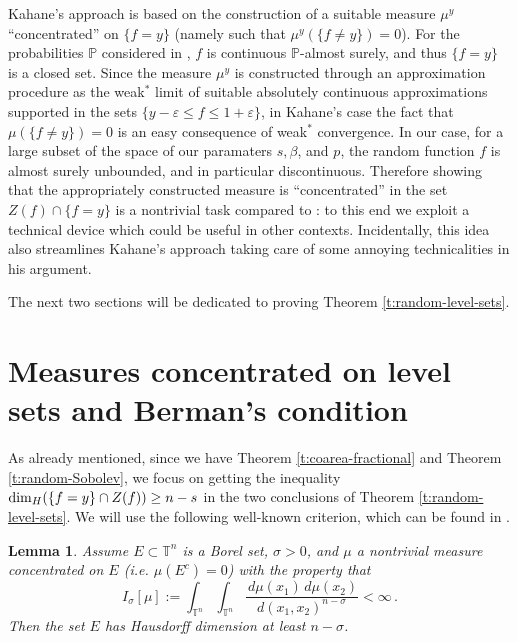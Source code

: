 \documentclass[11pt,reqno]{amsart}
\newcommand{\T}{{\mathbb T}}
\newtheorem{lemma}[theorem]{Lemma}
\theoremstyle{definition}
\numberwithin{equation}{section}
\begin{document}
\smallskip

Kahane's approach is based on the construction of a suitable measure $\mu^y$ ``concentrated'' on $\{f=y\}$ (namely such that $\mu^y (\{f\neq y\})=0$). For the probabilities $\mathbb P$ considered in  \cite{Kahane}, $f$ is continuous $\mathbb P$-almost surely, and thus $\{f=y\}$ is a closed set. Since the measure $\mu^y$ is constructed through an approximation procedure as the weak$^*$ limit of suitable absolutely continuous approximations supported in the sets $\{y-\varepsilon \leq f \leq 1+\varepsilon\}$, in Kahane's case the fact that $\mu (\{f\neq y\})=0$ is an easy consequence of weak$^*$ convergence. In our case, for a large subset of the space of our paramaters $s, \beta$, and $p$, the random function $f$ is almost surely unbounded, and in particular discontinuous. Therefore showing that the appropriately constructed measure is ``concentrated'' in the set $Z(f) \cap \{f=y\}$ is a nontrivial task compared to \cite{Kahane}: to this end we exploit a technical device which could be useful in other contexts. Incidentally, this idea also streamlines Kahane's approach taking care of some annoying technicalities in his argument.

The next two sections will be dedicated to proving Theorem \ref{t:random-level-sets}.

\section{Measures concentrated on level sets and Berman's condition}

As already mentioned, since we have Theorem \ref{t:coarea-fractional} and Theorem \ref{t:random-Sobolev}, we focus on getting the inequality ${\rm dim}_H (\{f=y\}\cap Z(f)) \geq n-s$ in the two conclusions of Theorem \ref{t:random-level-sets}. We will use the following well-known criterion, which can be found in \cite[Chapter 8]{Mat95}.

\begin{lemma}\label{l:measure-criterion}
Assume $E\subset \mathbb T^n$ is a Borel set, $\sigma>0$, and $\mu$ a {\em nontrivial} measure concentrated on $E$ (i.e. $\mu (E^c)=0$) with the property that 
\[
I_\sigma [\mu] :=\int_{\T^n}\int_{\T^n}\frac{\,d\mu (x_1)\,d\mu (x_2)}{d(x_1,x_2)^{n-\sigma}} < \infty\, .
\]
Then the set $E$ has Hausdorff dimension at least $n-\sigma$. 
\end{lemma}
\end{document}
